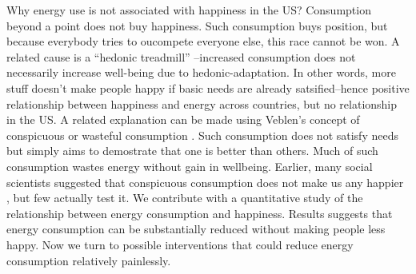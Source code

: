 \documentclass[10pt, letterpaper]{article}
\begin{document}
\begin{spacing}{1.4}
Why energy use is not associated with happiness in the US? 
Consumption beyond a point does not buy happiness. Such consumption buys
position, but because everybody tries to oucompete everyone else, this race
cannot be won. A related cause is a ``hedonic treadmill'' \cite{brickman78cj}--increased consumption does not necessarily increase well-being due to hedonic-adaptation. In other words, more stuff
doesn't make people happy if basic needs are already satsified--hence positive
relationship between happiness and energy across countries, but no relationship
in the US. %
 A related explanation can be made using Veblen's concept of conspicuous or
 wasteful consumption \cite{veblen05a, veblen05b}. Such consumption does not
 satisfy needs but simply aims to demostrate that
one is better than others. Much of such consumption wastes energy without gain
in wellbeing.%
Earlier, many social scientists suggested  that conspicuous consumption
does not make us any happier  \cite{csikszentmihalyi99, frank04, frank05, frank12}, but few actually test it. We contribute with a quantitative study of
the relationship between energy consumption and happiness. %
 Results suggests that  energy consumption can be substantially reduced
without making people less happy.  Now we turn to  possible interventions that could reduce energy consumption
 relatively painlessly. 


\end{spacing}
\end{document}
